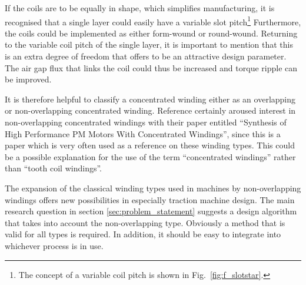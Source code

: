 If the coils are to be equally in shape, which simplifies manufacturing, it is recognised that a single layer could easily have a variable slot pitch\footnote{The concept of a variable coil pitch is shown in Fig.~\ref{fig:f_slotstar}.} Furthermore, the coils could be implemented as either form-wound or round-wound. Returning to the variable coil pitch of the single layer, it is important to mention that this is an extra degree of freedom that offers to be an attractive design parameter. The air gap flux that links the coil could thus be increased and torque ripple can be improved. 

It is therefore helpful to classify a concentrated winding either as an overlapping or non-overlapping concentrated winding. Reference \cite{REF-00754} certainly aroused interest in non-overlapping concentrated windings with their paper entitled ``Synthesis of High Performance PM Motors With Concentrated Windings'', since this is a paper which is very often used as a reference on these winding types. This could be a possible explanation for the use of the term ``concentrated windings'' rather than ``tooth coil windings''.

The expansion of the classical winding types used in machines by non-overlapping windings offers new possibilities in especially traction machine design. The main research question in section \ref{sec:problem_statement} suggests a design algorithm that takes into account the non-overlapping type. Obviously a method that is valid for all types is required. In addition, it should be easy to integrate into whichever process is in use.

